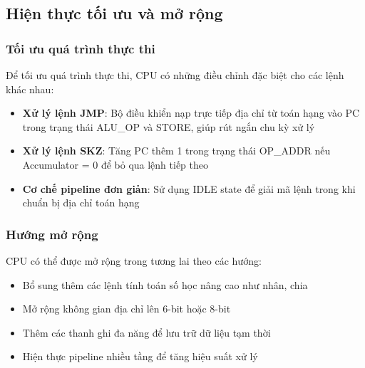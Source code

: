 \subsection{Hiện thực tối ưu và mở rộng}

\subsubsection{Tối ưu quá trình thực thi}

Để tối ưu quá trình thực thi, CPU có những điều chỉnh đặc biệt cho các lệnh khác nhau:

\begin{itemize}
    \item \textbf{Xử lý lệnh JMP}: Bộ điều khiển nạp trực tiếp địa chỉ từ toán hạng vào PC trong trạng thái ALU\_OP và STORE, giúp rút ngắn chu kỳ xử lý
    \item \textbf{Xử lý lệnh SKZ}: Tăng PC thêm 1 trong trạng thái OP\_ADDR nếu Accumulator = 0 để bỏ qua lệnh tiếp theo
    \item \textbf{Cơ chế pipeline đơn giản}: Sử dụng IDLE state để giải mã lệnh trong khi chuẩn bị địa chỉ toán hạng
\end{itemize}

\subsubsection{Hướng mở rộng}

CPU có thể được mở rộng trong tương lai theo các hướng:

\begin{itemize}
    \item Bổ sung thêm các lệnh tính toán số học nâng cao như nhân, chia
    \item Mở rộng không gian địa chỉ lên 6-bit hoặc 8-bit
    \item Thêm các thanh ghi đa năng để lưu trữ dữ liệu tạm thời
    \item Hiện thực pipeline nhiều tầng để tăng hiệu suất xử lý
\end{itemize}